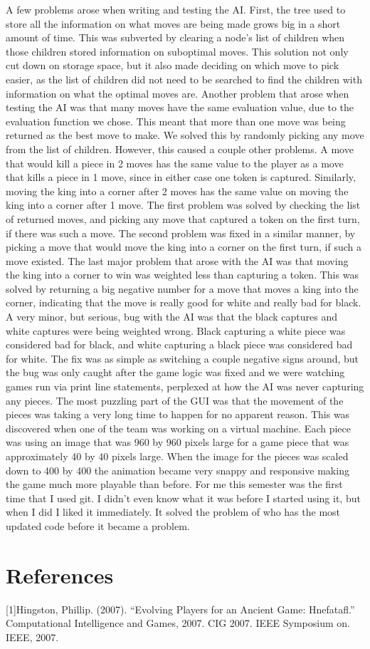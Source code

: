 \documentclass{article}
\begin{document}
	A few problems arose when writing and testing the AI. First, the tree used to store all the information on what moves are being made grows big in a short amount of time. This was subverted by clearing a node's list of children when those children stored information on suboptimal moves. This solution not only cut down on storage space, but it also made deciding on which move to pick easier, as the list of children did not need to be searched to find the children with information on what the optimal moves are. Another problem that arose when testing the AI was that many moves have the same evaluation value, due to the evaluation function we chose. This meant that more than one move was being returned as the best move to make. We solved this by randomly picking any move from the list of children. However, this caused a couple other problems. A move that would kill a piece in 2 moves has the same value to the player as a move that kills a piece in 1 move, since in either case one token is captured. Similarly, moving the king into a corner after 2 moves has the same value on moving the king into a corner after 1 move. The first problem was solved by checking the list of returned moves, and picking any move that captured a token on the first turn, if there was such a move. The second problem was fixed in a similar manner, by picking a move that would move the king into a corner on the first turn, if such a move existed. The last major problem that arose with the AI was that moving the king into a corner to win was weighted less than capturing a token. This was solved by returning a big negative number for a move that moves a king into the corner, indicating that the move is really good for white and really bad for black. A very minor, but serious, bug with the AI was that the black captures and white captures were being weighted wrong. Black capturing a white piece was considered bad for black, and white capturing a black piece was considered bad for white. The fix was as simple as switching a couple negative signs around, but the bug was only caught after the game logic was fixed and we were watching games run via print line statements, perplexed at how the AI was never capturing any pieces.
	The most puzzling part of the GUI was that the movement of the pieces was taking a very long time to happen for no apparent reason. This was discovered when one of the team was working on a virtual machine. Each piece was using an image that was 960 by 960 pixels large for a game piece that was approximately 40 by 40 pixels large. When the image for the pieces was scaled down to 400 by 400 the animation became very snappy and responsive making the game much more playable than before. 
	For me this semester was the first time that I used git. I didn't even know what it was before I started using it, but when I did I liked it immediately. It solved the problem of who has the most updated code before it became a problem. 

\section{References}
[1]Hingston, Phillip. (2007). “Evolving Players for an Ancient Game: Hnefatafl.” Computational Intelligence and Games, 2007. CIG 2007. IEEE Symposium on. IEEE, 2007.
\end{document}
